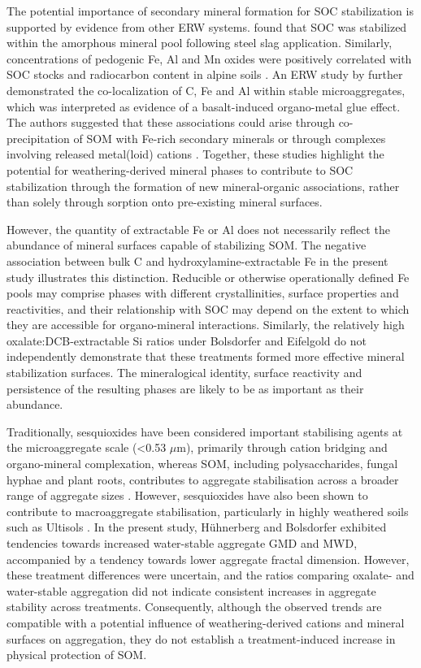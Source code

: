 \documentclass[preprint,12pt]{elsarticle}
\begin{document}
The potential importance of secondary mineral formation for SOC stabilization is supported by evidence from other ERW systems. \citep{steinwidder2025beyond} found that SOC was stabilized within the amorphous mineral pool following steel slag application. Similarly, concentrations of pedogenic Fe, Al and Mn oxides were positively correlated with SOC stocks and radiocarbon content in alpine soils \citep{maier2025parent}. An ERW study by \citep{matsuoka2025formation} further demonstrated the co-localization of C, Fe and Al within stable microaggregates, which was interpreted as evidence of a basalt-induced organo-metal glue effect. The authors suggested that these associations could arise through co-precipitation of SOM with Fe-rich secondary minerals or through complexes involving released metal(loid) cations \citep{matsuoka2025formation}. Together, these studies highlight the potential for weathering-derived mineral phases to contribute to SOC stabilization through the formation of new mineral-organic associations, rather than solely through sorption onto pre-existing mineral surfaces.

However, the quantity of extractable Fe or Al does not necessarily reflect the abundance of mineral surfaces capable of stabilizing SOM. The negative association between bulk C and hydroxylamine-extractable Fe in the present study illustrates this distinction. Reducible or otherwise operationally defined Fe pools may comprise phases with different crystallinities, surface properties and reactivities, and their relationship with SOC may depend on the extent to which they are accessible for organo-mineral interactions. Similarly, the relatively high oxalate:DCB-extractable Si ratios under Bolsdorfer and Eifelgold do not independently demonstrate that these treatments formed more effective mineral stabilization surfaces. The mineralogical identity, surface reactivity and persistence of the resulting phases are likely to be as important as their abundance.

Traditionally, sesquioxides have been considered important stabilising agents at the microaggregate scale (<0.53 $\mu$m), primarily through cation bridging and organo-mineral complexation, whereas SOM, including polysaccharides, fungal hyphae and plant roots, contributes to aggregate stabilisation across a broader range of aggregate sizes \citep{TisdallOades1982}. However, sesquioxides have also been shown to contribute to macroaggregate stabilisation, particularly in highly weathered soils such as Ultisols \citep{Barthes2008,Peng2015}. In the present study, Hühnerberg and Bolsdorfer exhibited tendencies towards increased water-stable aggregate GMD and MWD, accompanied by a tendency towards lower aggregate fractal dimension. However, these treatment differences were uncertain, and the ratios comparing oxalate- and water-stable aggregation did not indicate consistent increases in aggregate stability across treatments. Consequently, although the observed trends are compatible with a potential influence of weathering-derived cations and mineral surfaces on aggregation, they do not establish a treatment-induced increase in physical protection of SOM.
\end{document}
